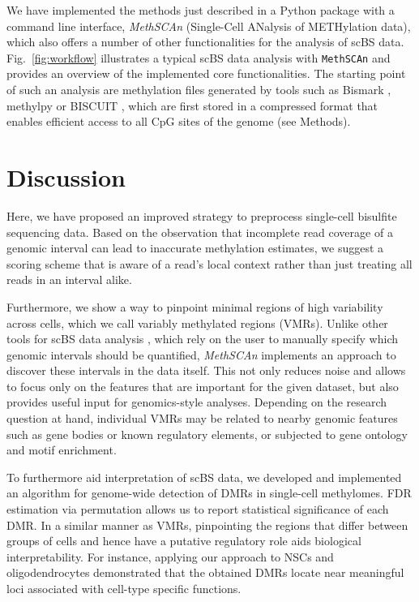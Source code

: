 \documentclass[10pt]{article}
\begin{document}
We have implemented the methods just described in a Python package with a command line interface, \textit{MethSCAn} (Single-Cell ANalysis of METHylation data), which also offers a number of other functionalities for the analysis of scBS data. 
Fig.~\ref{fig:workflow} illustrates a typical scBS data analysis with \texttt{MethSCAn} and provides an overview of the implemented core functionalities.
The starting point of such an analysis are methylation files generated by tools such as Bismark \citep{bismark}, methylpy \citep{methylpy} or BISCUIT \citep{biscuit}, which are first stored in a compressed format that enables efficient access to all CpG sites of the genome (see Methods).

\section*{Discussion}

Here, we have proposed an improved strategy to preprocess single-cell bisulfite sequencing data.
Based on the observation that incomplete read coverage of a genomic interval can lead to inaccurate methylation estimates, we suggest a scoring scheme that is aware of a read's local context rather than just treating all reads in an interval alike. 

Furthermore, we show a way to pinpoint minimal regions of high variability across cells, which we call variably methylated regions (VMRs).
Unlike other tools for scBS data analysis \citep{kapourani2019melissa, kapourani2021scmet, danese2021episcanpy}, which rely on the user to manually specify which genomic intervals should be quantified, \textit{MethSCAn} implements an approach to discover these intervals in the data itself. This not only reduces noise and allows to focus only on the features that are important for the given dataset, but also provides useful input for genomics-style analyses.
Depending on the research question at hand, individual VMRs may be related to nearby genomic features such as gene bodies or known regulatory elements, or subjected to gene ontology and motif enrichment.

To furthermore aid interpretation of scBS data, we developed and implemented an algorithm for genome-wide detection of DMRs in single-cell methylomes.
FDR estimation via permutation allows us to report statistical significance of each DMR.
In a similar manner as VMRs, pinpointing the regions that differ between groups of cells and hence have a putative regulatory role aids biological interpretability.
For instance, applying our approach to NSCs and oligodendrocytes demonstrated that the obtained DMRs locate near meaningful loci associated with cell-type specific functions.
\end{document}
